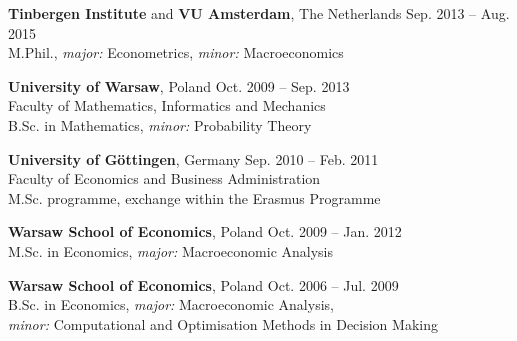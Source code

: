 \documentclass[margin,line]{resume}
\begin{document}
\begin{resume}
\vspace{-1mm}

    \textbf{Tinbergen Institute} and \textbf{VU Amsterdam}, The Netherlands  \hfill Sep. 2013 -- Aug. 2015 	
	\vspace{1mm}\\
	M.Phil., \textit{major:} Econometrics, \textit{minor:} Macroeconomics 

\vspace{-1mm}

	\textbf{University of Warsaw}, Poland  \hfill Oct. 2009 -- Sep. 2013 	
	\vspace{1mm}\\
	Faculty of Mathematics, Informatics and Mechanics \\B.Sc. in Mathematics, \textit{minor:} Probability Theory 
    
\vspace{-1mm}

	\textbf{University of G{\"o}ttingen}, Germany   \hfill Sep. 2010 -- Feb. 2011	
	\vspace{1mm}\\
    Faculty of Economics and Business Administration \\M.Sc. programme, exchange within the Erasmus Programme

\vspace{-1mm}

	\textbf{Warsaw School of Economics}, Poland   \hfill Oct. 2009 -- Jan. 2012
	\vspace{1mm}\\
	M.Sc. in Economics, \textit{major:} Macroeconomic Analysis

\vspace{-1mm}

 	\textbf{Warsaw School of Economics}, Poland  \hfill Oct. 2006 --  Jul. 2009
	\vspace{1mm}\\
   	B.Sc. in Economics, \textit{major:} Macroeconomic Analysis,\\ 
    \textit{minor:} Computational and Optimisation Methods in Decision Making\\
    
\vspace{-4mm}


\end{resume}
\end{document}
